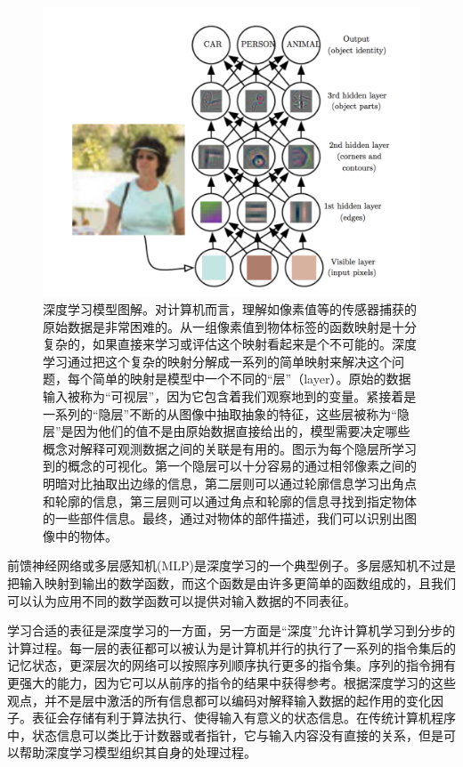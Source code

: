 \documentclass[a4paper,11pt]{book}
\begin{document}
\begin{figure}[htbp] %
   \centering
   \includegraphics[width=5in]{fig/chap1/deep_learning_intro.png} 
   \caption{深度学习模型图解。对计算机而言，理解如像素值等的传感器捕获的原始数据是非常困难的。从一组像素值到物体标签的函数映射是十分复杂的，如果直接来学习或评估这个映射看起来是个不可能的。深度学习通过把这个复杂的映射分解成一系列的简单映射来解决这个问题，每个简单的映射是模型中一个不同的“层”（layer）。原始的数据输入被称为“可视层”，因为它包含着我们观察地到的变量。紧接着是一系列的“隐层”不断的从图像中抽取抽象的特征，这些层被称为“隐层”是因为他们的值不是由原始数据直接给出的，模型需要决定哪些概念对解释可观测数据之间的关联是有用的。图示为每个隐层所学习到的概念的可视化。第一个隐层可以十分容易的通过相邻像素之间的明暗对比抽取出边缘的信息，第二层则可以通过轮廓信息学习出角点和轮廓的信息，第三层则可以通过角点和轮廓的信息寻找到指定物体的一些部件信息。最终，通过对物体的部件描述，我们可以识别出图像中的物体。}
   \label{fig:deep_learning_intro}
\end{figure}


前馈神经网络或多层感知机(MLP)是深度学习的一个典型例子。多层感知机不过是把输入映射到输出的数学函数，而这个函数是由许多更简单的函数组成的，且我们可以认为应用不同的数学函数可以提供对输入数据的不同表征。


学习合适的表征是深度学习的一方面，另一方面是“深度”允许计算机学习到分步的计算过程。每一层的表征都可以被认为是计算机并行的执行了一系列的指令集后的记忆状态，更深层次的网络可以按照序列顺序执行更多的指令集。序列的指令拥有更强大的能力，因为它可以从前序的指令的结果中获得参考。根据深度学习的这些观点，并不是层中激活的所有信息都可以编码对解释输入数据的起作用的变化因子。表征会存储有利于算法执行、使得输入有意义的状态信息。在传统计算机程序中，状态信息可以类比于计数器或者指针，它与输入内容没有直接的关系，但是可以帮助深度学习模型组织其自身的处理过程。
\end{document}
